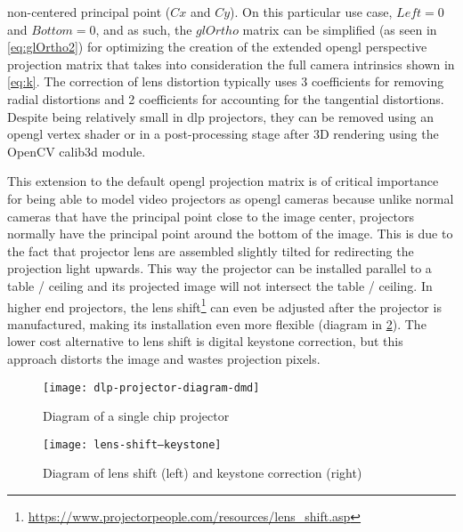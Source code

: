 non-centered principal point ($Cx$ and $Cy$). On this particular use case, $Left=0$ and $Bottom=0$, and as such, the $glOrtho$ matrix can be simplified (as seen in \cref{eq:glOrtho2}) for optimizing the creation of the extended \gls{opengl} perspective projection matrix that takes into consideration the full camera intrinsics shown in \cref{eq:k}. The correction of lens distortion typically uses 3 coefficients for removing radial distortions and 2 coefficients for accounting for the tangential distortions. Despite being relatively small in \gls{dlp} projectors, they can be removed using an \gls{opengl} vertex shader or in a post-processing stage after 3D rendering using the OpenCV calib3d module.

This extension to the default \gls{opengl} projection matrix is of critical importance for being able to model video projectors as \gls{opengl} cameras because unlike normal cameras that have the principal point close to the image center, projectors normally have the principal point around the bottom of the image. This is due to the fact that projector lens are assembled slightly tilted for redirecting the projection light upwards. This way the projector can be installed parallel to a table / ceiling and its projected image will not intersect the table / ceiling. In higher end projectors, the lens shift\footnote{\url{https://www.projectorpeople.com/resources/lens_shift.asp}} can even be adjusted after the projector is manufactured, making its installation even more flexible (diagram in \cref{fig:lens-shift--keystone}). The lower cost alternative to lens shift is digital keystone correction, but this approach distorts the image and wastes projection pixels.
\vspace{-0.2em}
\begin{figure}[H]
	\centering
	\texttt{[image: dlp-projector-diagram-dmd]}
	\caption[Diagram of a single chip  projector]{Diagram of a single chip  projector\protect\footnotemark}
	\label{fig:dlp-projector-diagram-dmd}
	\vspace{-0.7em}
\end{figure}
\vspace{-0.9em}
\begin{figure}[H]
	\centering
	\texttt{[image: lens-shift--keystone]}
	\caption[Diagram of lens shift (left) and keystone correction (right)]{Diagram of lens shift (left) and keystone correction (right)\protect\footnotemark}
	\label{fig:lens-shift--keystone}
	\vspace{-0.7em}
\end{figure}
